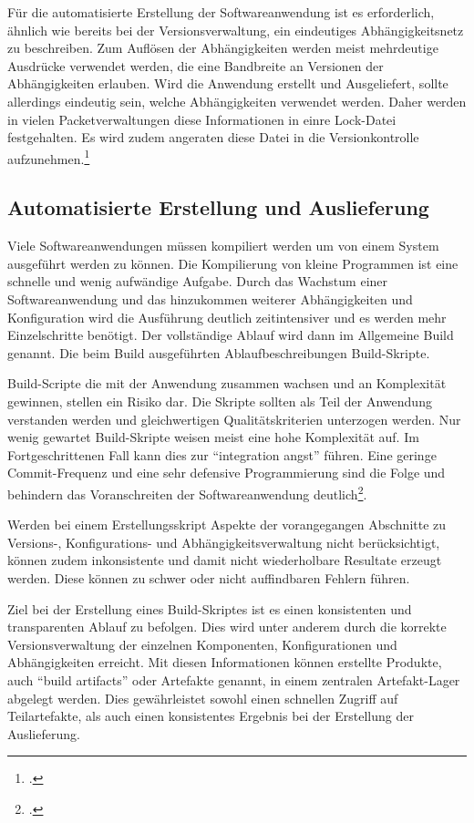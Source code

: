 Für die automatisierte Erstellung der Softwareanwendung ist es erforderlich, ähnlich wie bereits bei der 
Versionsverwaltung, ein eindeutiges Abhängigkeitsnetz zu beschreiben. Zum Auflösen der Abhängigkeiten werden meist 
mehrdeutige Ausdrücke verwendet werden, die eine Bandbreite an Versionen der Abhängigkeiten erlauben. Wird die Anwendung 
erstellt und Ausgeliefert, sollte allerdings eindeutig sein, welche Abhängigkeiten verwendet werden. Daher werden in 
vielen Packetverwaltungen diese Informationen in einre Lock-Datei festgehalten. Es wird zudem angeraten diese Datei in 
die Versionkontrolle aufzunehmen.\footcite{composer-why-lock-in-vcs}

\subsection{Automatisierte Erstellung und Auslieferung}

Viele Softwareanwendungen müssen kompiliert werden um von einem System ausgeführt werden zu können. Die Kompilierung von kleine Programmen ist eine schnelle und wenig aufwändige Aufgabe. Durch das Wachstum einer Softwareanwendung und das hinzukommen weiterer Abhängigkeiten und Konfiguration wird die Ausführung deutlich zeitintensiver und es werden mehr Einzelschritte benötigt. Der vollständige Ablauf wird dann im Allgemeine Build genannt. Die beim Build ausgeführten Ablaufbeschreibungen Build-Skripte. 

Build-Scripte die mit der Anwendung zusammen wachsen und an Komplexität gewinnen, stellen ein Risiko dar. Die Skripte sollten als Teil der Anwendung verstanden werden und gleichwertigen Qualitätskriterien unterzogen werden. Nur wenig gewartet Build-Skripte weisen meist eine hohe Komplexität auf. Im Fortgeschrittenen Fall kann dies zur  ``integration angst'' führen. Eine geringe Commit-Frequenz und eine sehr defensive Programmierung sind die Folge und behindern das Voranschreiten der Softwareanwendung deutlich\footcite{ci-is-not-build-systems}.

Werden bei einem Erstellungsskript Aspekte der vorangegangen Abschnitte zu Versions-, Konfigurations- und Abhängigkeitsverwaltung nicht berücksichtigt, können zudem inkonsistente und damit nicht 
wiederholbare Resultate erzeugt werden. Diese können zu schwer oder nicht auffindbaren Fehlern führen.

Ziel bei der Erstellung eines Build-Skriptes ist es einen konsistenten und transparenten Ablauf zu 
befolgen. Dies wird unter anderem durch die korrekte Versionsverwaltung der einzelnen Komponenten, Konfigurationen und 
Abhängigkeiten erreicht. Mit diesen Informationen können erstellte Produkte, auch ``build artifacts'' oder Artefakte 
genannt, in einem zentralen Artefakt-Lager abgelegt werden. Dies gewährleistet sowohl einen schnellen Zugriff auf 
Teilartefakte, als auch einen konsistentes Ergebnis bei der Erstellung der Auslieferung.

